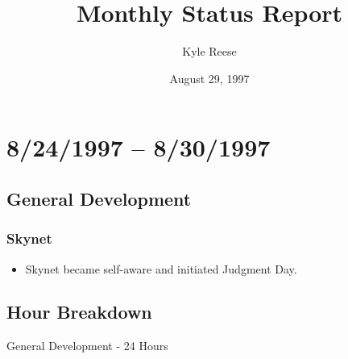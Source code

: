 \documentclass[12pt]{article}
\title{Monthly Status Report}
\author{Kyle Reese}
\date{August 29, 1997}
\begin{document}
\newpage
\maketitle
\section{8/24/1997 -- 8/30/1997}
\subsection{General Development}
\subsubsection{Skynet}
\begin{itemize}
	\item Skynet became self-aware and initiated Judgment Day.
\end{itemize}
\subsection{Hour Breakdown}
General Development - 24 Hours
\end{document}
